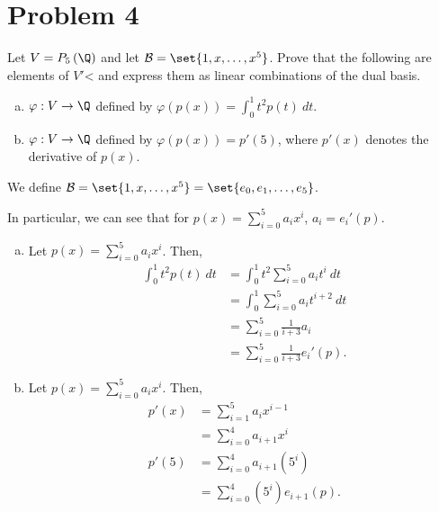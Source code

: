 \documentclass[10pt]{mypackage}
\begin{document}
\section{Problem 4}%
\begin{problem}
  Let $V = P_{5}\left(\Q\right)$ and let $\mathcal{B} = \set{1,x,\dots,x^5}$. Prove that the following are elements of $V'$< and express them as linear combinations of the dual basis.
  \begin{enumerate}[(a)]
    \item $\varphi: V\rightarrow \Q$ defined by $\varphi\left(p(x)\right) = \int_{0}^{1} t^2p(t)\:dt$.
    \item $\varphi: V\rightarrow \Q$ defined by $\varphi\left(p(x)\right) = p'(5)$, where $p'(x)$ denotes the derivative of $p(x)$.
  \end{enumerate}
\end{problem}
\begin{solution}
  We define $\mathcal{B} = \set{1,x,\dots,x^5} = \set{e_0,e_1,\dots,e_5}$.\newline

  In particular, we can see that for $p(x) =\sum_{i=0}^{5}a_ix^i$, $a_i = e_i'\left(p\right)$.
  \begin{enumerate}[(a)]
    \item Let $p(x) = \sum_{i=0}^{5}a_ix^i$. Then,
      \begin{align*}
        \int_{0}^{1} t^2p(t)\:dt &= \int_{0}^{1} t^2\sum_{i=0}^{5}a_it^i\:dt\\
                                 &= \int_{0}^{1} \sum_{i=0}^{5}a_it^{i+2}\:dt\\
                                 &= \sum_{i=0}^{5}\frac{1}{i+3}a_i\\
                                 &= \sum_{i=0}^{5}\frac{1}{i+3}e_i'\left(p\right).
      \end{align*}
    \item Let $p(x) = \sum_{i=0}^{5}a_ix^i$. Then,
      \begin{align*}
        p'(x) &= \sum_{i=1}^{5}a_ix^{i-1}\\
              &= \sum_{i=0}^{4}a_{i+1}x^{i}\\
        p'(5) &= \sum_{i=0}^{4}a_{i+1}\left(5^{i}\right)\\
              &= \sum_{i=0}^{4}\left(5^i\right)e_{i+1}\left(p\right).
      \end{align*}
  \end{enumerate}
\end{solution}
\end{document}
